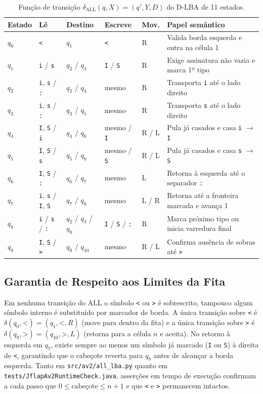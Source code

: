 \begin{table}[t]
\centering
\caption{Função de transição $\delta_{\text{ALL}}(q, X) = (q', Y, D)$ do D-LBA de 11 estados.}
\label{tab:all_delta}
\footnotesize
\setlength{\tabcolsep}{6pt}
\begin{tabular}{@{}llllll@{}}
\toprule
Estado & Lê & Destino & Escreve & Mov. & Papel semântico \\
\midrule
$q_0$ & \texttt{<} & $q_1$ & \texttt{<} & R & Valida borda esquerda e entra na célula 1 \\
$q_1$ & \texttt{i} / \texttt{s} & $q_2$ / $q_3$ & \texttt{I} / \texttt{S} & R & Exige assinatura não vazia e marca 1º tipo \\
$q_2$ & \texttt{i}, \texttt{s} / \texttt{:} & $q_2$ / $q_4$ & mesmo & R & Transporta \texttt{i} até o lado direito \\
$q_3$ & \texttt{i}, \texttt{s} / \texttt{:} & $q_3$ / $q_5$ & mesmo & R & Transporta \texttt{s} até o lado direito \\
$q_4$ & \texttt{I}, \texttt{S} / \texttt{i} & $q_4$ / $q_6$ & mesmo / \texttt{I} & R / L & Pula já casados e casa \texttt{i} $\to$ \texttt{I} \\
$q_5$ & \texttt{I}, \texttt{S} / \texttt{s} & $q_5$ / $q_6$ & mesmo / \texttt{S} & R / L & Pula já casados e casa \texttt{s} $\to$ \texttt{S} \\
$q_6$ & \texttt{I}, \texttt{S} / \texttt{:} & $q_6$ / $q_7$ & mesmo & L & Retorna à esquerda até o separador \texttt{:} \\
$q_7$ & \texttt{i}, \texttt{s} / \texttt{I}, \texttt{S} & $q_7$ / $q_8$ & mesmo & L / R & Retorna até a fronteira marcada e avança 1 \\
$q_8$ & \texttt{i} / \texttt{s} / \texttt{:} & $q_2$ / $q_3$ / $q_9$ & \texttt{I} / \texttt{S} / \texttt{:} & R & Marca próximo tipo ou inicia varredura final \\
$q_9$ & \texttt{I}, \texttt{S} / \texttt{>} & $q_9$ / $q_{10}$ & mesmo & R / L & Confirma ausência de sobras até \texttt{>} \\
\bottomrule
\end{tabular}
\end{table}

\subsection{Garantia de Respeito aos Limites da Fita}

Em nenhuma transição do ALL o símbolo \texttt{<} ou \texttt{>} é sobrescrito, tampouco algum símbolo interno é substituído por marcador de borda. A única transição sobre \texttt{<} é $\delta(q_0, \texttt{<}) = (q_1, \texttt{<}, R)$ (move para dentro da fita) e a única transição sobre \texttt{>} é $\delta(q_9, \texttt{>}) = (q_{10}, \texttt{>}, L)$ (retorna para a célula $n$ e aceita). No retorno à esquerda em $q_7$, existe sempre ao menos um símbolo já marcado (\texttt{I} ou \texttt{S}) à direita de \texttt{<}, garantindo que o cabeçote reverta para $q_8$ antes de alcançar a borda esquerda. Tanto em \texttt{src/av2/all\_lba.py} quanto em \texttt{tests/JflapAv2RuntimeCheck.java}, asserções em tempo de execução confirmam a cada passo que $0 \le \text{cabeçote} \le n + 1$ e que \texttt{<} e \texttt{>} permanecem intactos.
